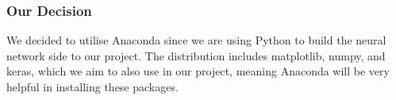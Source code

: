 \subsubsection{Our Decision}
We decided to utilise Anaconda since we are using Python to build the neural network side to our project. The distribution includes matplotlib, numpy, and keras, which we aim to also use in our project, meaning Anaconda will be very helpful in installing these packages.
